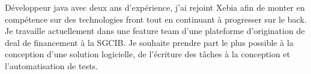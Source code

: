 
\begin{cvparagraph}

Développeur java avec deux ans d'expérience, j'ai rejoint Xebia afin de monter en compétence sur des technologies front tout en continuant à progresser sur le back. Je travaille actuellement dans une feature team d'une plateforme d'origination de deal de financement à la SGCIB. Je souhaite prendre part le plus possible à la conception d'une solution logicielle, de l'écriture des tâches à la conception et l'automatisation de tests.

\end{cvparagraph}
